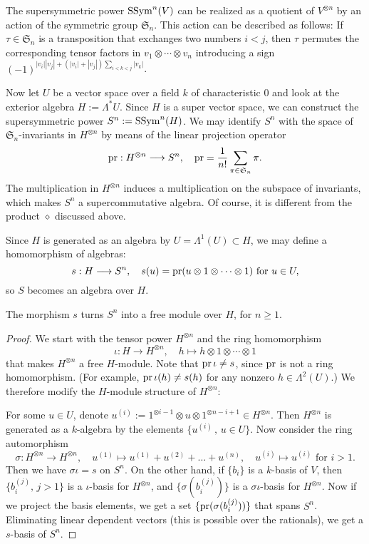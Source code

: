 \begin{remark}
The supersymmetric power $\operatorname{SSym}^n (V)$ can be realized as a quotient of $V^{\otimes n}$ by an action of the symmetric group $\mathfrak S_n$. This action can be described as follows: If $\tau\in \mathfrak S_n$ is a transposition that exchanges two numbers $i<j$, then $\tau$ permutes the corresponding tensor factors in $v_1\otimes  \cdots\otimes v_n$ introducing a sign
$(-1)^{|v_i||v_j|+(|v_i|+|v_j|)\sum_{i<k<j} |v_k|}$.
\end{remark}


Now let $U$ be a vector space over a field $k$ of characteristic $0$ and look at the exterior algebra $H:= \Lambda^* U$. 
Since $H$ is a super vector space, we can construct the supersymmetric power $S^n:= \operatorname{SSym}^n( H)$.
We may identify $S^n$ with the space of $\mathfrak S_n$-invariants in $H^{\otimes n}$ by means of the linear projection operator
$$
\operatorname{pr} : H^{\otimes n} \longrightarrow S^n , \quad \operatorname{pr} = \frac{1}{n!}\sum_{\pi \in\mathfrak S_n} \pi.
$$
The multiplication in $H^{\otimes n}$ induces a multiplication on the subspace of invariants, which makes $S^n$ a supercommutative algebra. Of course, it is different from the product $\diamond$ discussed above.

Since $H$ is generated as an algebra by $U=\Lambda^1(U)\subset H$, we may define a homomorphism of algebras:
$$ s : H \longrightarrow S^n, \quad s(u) = \operatorname{pr}( u \otimes 1\otimes\cdots\otimes 1)\text{ for }u\in U, $$
so $S$ becomes an algebra over $H$.
\begin{lemma}
\label{SuperFree}
The morphism $s$ turns $S^n$ into a free module over $H$, for $n\geq 1$.
\end{lemma}
\begin{proof}
We start with the tensor power $H^{\otimes n}$ and the ring homomorphism 
$$
\iota : H \longrightarrow H^{\otimes n},\quad h\longmapsto h\otimes 1\otimes\cdots\otimes 1
$$
that makes $H^{\otimes n}$ a free $H$-module. Note that $\operatorname{pr} \iota \neq s$, since $\operatorname{pr}$ is not a ring homomorphism.
(For example, $\operatorname{pr}\iota(h)\neq s(h)$ for any nonzero $h\in\Lambda^2(U)$.)
We therefore modify the $H$-module structure of $H^{\otimes n}$:

For some $u\in U$, denote $u^{(i)} := 1^{\otimes i-1}\otimes u\otimes 1^{\otimes n-i+1} \in H^{\otimes n}$. Then $H^{\otimes n}$ is generated as a $k$-algebra by the elements $\{u^{(i)}\,,\,u\in U\}$. Now consider the ring automorphism
$$
\sigma : H^{\otimes n} \longrightarrow H^{\otimes n}, \quad u^{(1)} \longmapsto u^{(1)} +u^{(2)} + \ldots + u^{(n)}, \quad
u^{(i)} \longmapsto u^{(i)} \text{ for } i>1.
$$
Then we have $\sigma\iota = s$ on $S^n$. On the other hand, if $\{b_i\}$ is a $k$-basis of $V$, then $\{b_i^{(j)},\,j>1\} $ is a $\iota$-basis for $H^{\otimes n}$, and $\{\sigma(b_i^{(j)})\}$ is a $\sigma\iota$-basis for $H^{\otimes n}$.
Now if we project the basis elements, we get a set $\{\operatorname{pr}(\sigma(b_i^{(j)}))\}$ that spans $S^n$. Eliminating linear dependent vectors (this is possible over the rationals), we get a $s$-basis of $S^n$.
\end{proof}

